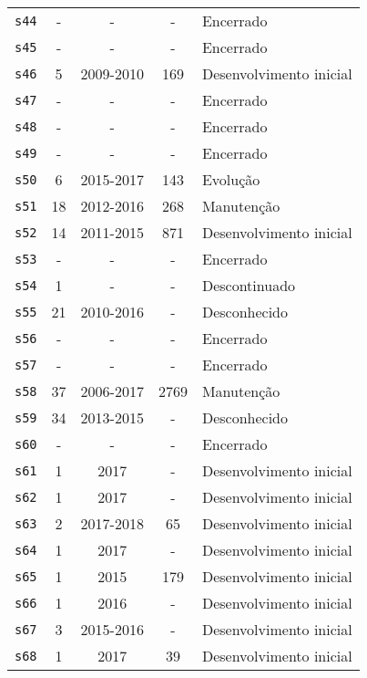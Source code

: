\begin{longtable}{ l c c c l }
    \texttt{s44} & - & - & - & Encerrado \\
    \texttt{s45} & - & - & - & Encerrado \\
    \texttt{s46} & 5 & 2009-2010 & 169 & Desenvolvimento inicial \\
    \texttt{s47} & - & - & - & Encerrado \\
    \texttt{s48} & - & - & - & Encerrado \\
    \texttt{s49} & - & - & - & Encerrado \\
    \texttt{s50} & 6 & 2015-2017 & 143 & Evolução \\
    \texttt{s51} & 18 & 2012-2016 & 268 & Manutenção \\
    \texttt{s52} & 14 & 2011-2015 & 871 & Desenvolvimento inicial \\
    \texttt{s53} & - & - & - & Encerrado \\
    \texttt{s54} & 1 & - & - & Descontinuado \\
    \texttt{s55} & 21 & 2010-2016 & - & Desconhecido \\
    \texttt{s56} & - & - & - & Encerrado \\
    \texttt{s57} & - & - & - & Encerrado \\
    \texttt{s58} & 37 & 2006-2017 & 2769 & Manutenção \\
    \texttt{s59} & 34 & 2013-2015 & - & Desconhecido \\
    \texttt{s60} & - & - & - & Encerrado \\
    \texttt{s61} & 1 & 2017 & - & Desenvolvimento inicial \\
    \texttt{s62} & 1 & 2017 & - & Desenvolvimento inicial \\
    \texttt{s63} & 2 & 2017-2018 & 65 & Desenvolvimento inicial \\
    \texttt{s64} & 1 & 2017 & - & Desenvolvimento inicial \\
    \texttt{s65} & 1 & 2015 & 179 & Desenvolvimento inicial \\
    \texttt{s66} & 1 & 2016 & - & Desenvolvimento inicial \\
    \texttt{s67} & 3 & 2015-2016 & - & Desenvolvimento inicial \\
    \texttt{s68} & 1 & 2017 & 39 & Desenvolvimento inicial \\
\end{longtable}
